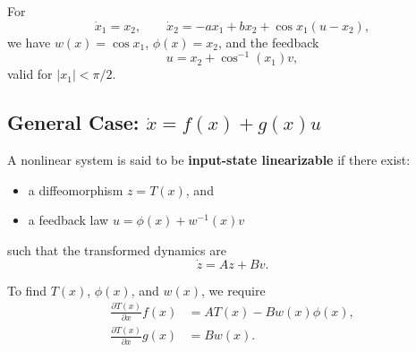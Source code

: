 \begin{example}[Example 10.9]
For
\begin{equation}
\dot{x}_1 = x_2, \qquad \dot{x}_2 = -a x_1 + b x_2 + \cos x_1 (u - x_2),
\end{equation}
we have $w(x) = \cos x_1$, $\phi(x) = x_2$, and the feedback
\begin{equation}
u = x_2 + \cos^{-1}(x_1) v,
\end{equation}
valid for $|x_1| < \pi/2$.
\end{example}

\subsection{General Case: $\dot{x} = f(x) + g(x)u$}

A nonlinear system is said to be \textbf{input-state linearizable} if there exist:
\begin{itemize}
    \item a diffeomorphism $z = T(x)$, and
    \item a feedback law $u = \phi(x) + w^{-1}(x)v$
\end{itemize}
such that the transformed dynamics are
\begin{equation}
\dot{z} = A z + B v.
\end{equation}

\noindent To find $T(x)$, $\phi(x)$, and $w(x)$, we require
\begin{align}
\frac{\partial T(x)}{\partial x} f(x) &= A T(x) - B w(x)\phi(x), \label{eq:T_f}\\
\frac{\partial T(x)}{\partial x} g(x) &= B w(x). \label{eq:T_g}
\end{align}


